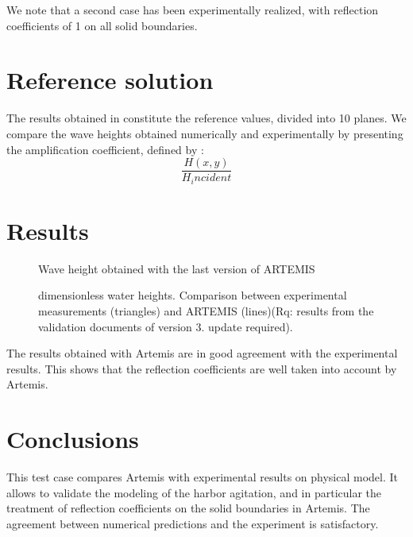 We note that a second case has been experimentally realized, with reflection coefficients
of 1 on all solid boundaries.

\section{Reference solution}

The results obtained in \cite{wavepenetration81} constitute the reference values, divided into 10 planes.
We compare the wave heights obtained numerically and experimentally by
presenting the amplification coefficient, defined by :
$$
\frac{H(x,y)}{H_incident}
$$

\section{Results}

\begin{figure}[h]
\begin{center}
\end{center}
\caption{ Wave height obtained with the last version of ARTEMIS}
\label{fig:port_waveheight}
\end{figure}


\begin{figure}[h]
\begin{center}
\end{center}
\caption{ dimensionless water heights. Comparison between experimental measurements
(triangles) and ARTEMIS (lines)(Rq: results from the validation documents of version 3. update required).}
\label{fig:port_resu}
\end{figure}


The results obtained with Artemis are in good agreement with the experimental results. This
shows that the reflection coefficients are well taken into account by Artemis.


\section{Conclusions}

This test case compares Artemis with experimental results on physical model. It allows 
to validate the modeling of the harbor agitation, and in particular the treatment of
reflection coefficients on the solid boundaries in Artemis. The agreement between numerical predictions
and the experiment is satisfactory.


